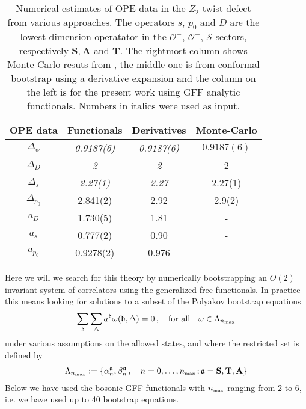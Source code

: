 \documentclass[12pt]{article}
\numberwithin{equation}{section}
\newcommand{\bea}{\begin{eqnarray}}
\newcommand{\eea}{\end{eqnarray}}
\newcommand{\ba}{\begin{equation}\begin{aligned}}
\newcommand{\ea}{\end{aligned}\end{equation}}
\newcommand{\mbf}{\mathbf}
\def\D{\Delta}
\newcommand{\mf}[1]{\mathfrak #1}
\begin{document}
	
	\begin{table}[h]
		
		\begin{center}
			\begin{tabular}{|c|c|c|c|}
				\hline
				OPE data	& Functionals & Derivatives & Monte-Carlo  \\ \hline
				$\D_\psi$ & \textit{0.9187(6)}  & \textit{0.9187(6)} & $0.9187(6)$  \\
				$\D_D$ &\textit{2} & \textit{2} &  2  \\
				$\D_s$ &  \textit{2.27(1)} & \textit{2.27} & 2.27(1) \\
				$\D_{p_0}$ & 2.841(2) & 2.92 & 2.9(2)  \\
				$a_{D}$ &  1.730(5) &1.81 &  - \\
				$a_{s}$ & 0.777(2) & 0.90  & - \\
				$a_{p_0}$ & 0.9278(2)  &0.976  & -  \\ \hline 
			\end{tabular}
			\caption{\label{numtab}Numerical estimates of OPE data in the $Z_2$ twist defect from various approaches. The operators $s$, $p_0$ and $D$ are the lowest dimension operatator in the $\mathcal O^+$, $\mathcal O^-$, $\mathcal S$ sectors, respectively $\mbf S, \mbf A$ and $\mbf T$. The rightmost column shows Monte-Carlo resuts from \cite{Billo:2013jda}, the middle one is from conformal bootstrap using a derivative expansion \cite{Gaiotto:2013nva} and the column on the left is for the present work using GFF analytic functionals. Numbers in italics were used as input.  }
		\end{center}
	\end{table}
	
	
	Here we will we search for this theory by numerically bootstrapping an $O(2)$ invariant system of correlators using the generalized free functionals. In practice this means looking for solutions to a subset of the Polyakov bootstrap equations
	\bea
	\sum_{\mf b} \sum_{\Delta} a^{\mf b} \omega(\mf b,\Delta)=0\,,\quad \mbox{for all} \quad \omega \in \Lambda_{n_{\mbox{\tiny max}}}
	\eea
	under various assumptions on the allowed states, and where the restricted set is defined by
	\ba
	\Lambda_{n_{\mbox{\tiny max}}}:=\left\{ \alpha_n^{\mf a},\beta_n^{\mf a}\,, \quad n=0,\ldots,n_{\mbox{\tiny max}}\,; \mf a=\mbf S, \mbf T,\mbf A\right\}
	\ea
	Below we have used the bosonic GFF functionals with $n_{\mbox{\tiny max}}$ ranging from 2 to 6, i.e. we have used up to 40 bootstrap equations.
	
\end{document}
